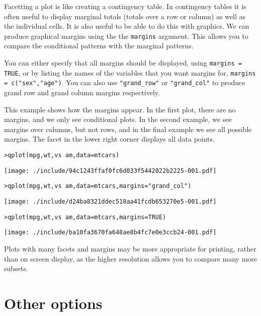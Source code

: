 Facetting a plot is like creating a contingency table.  In contingency tables it is often useful to display marginal totals (totals over a row or column) as well as the individual cells.  It is also useful to be able to do this with graphics.  We can produce graphical margins using the the {\tt margins} argument.  This allows you to compare the conditional patterns with the marginal patterns.

You can either specify that all margins should be displayed, using {\tt margins = TRUE}, or by listing the names of the variables that you want margins for, {\tt margins = c("sex","age")}.  You can also use \verb|"grand_row"| or \verb|"grand_col"| to produce grand row and grand column margins respectively.

This example shows how the margins appear.  In the first plot, there are no margins, and we only see conditional plots.  In the second example, we see margins over columns, but not rows, and in the final example we see all possible margins.  The facet in the lower right corner displays all data points.

\begin{alltt}
> qplot(mpg, wt, vs ~ am, data = mtcars)
\end{alltt}
\texttt{[image: ./include/94c1243ffaf0fc6d033f5442022b2225-001.pdf]}
\begin{alltt}

> qplot(mpg, wt, vs ~ am, data = mtcars, margins = "grand_col")
\end{alltt}
\texttt{[image: ./include/d24ba8321ddec518aa41fcdb653270e5-001.pdf]}
\begin{alltt}

> qplot(mpg, wt, vs ~ am, data = mtcars, margins = TRUE)
\end{alltt}
\texttt{[image: ./include/ba10fa3670fa648ae8b4fc7e0e3ccb24-001.pdf]}
\begin{alltt}

\end{alltt}

Plots with many facets and margins may be more appropriate for printing, rather than on screen display, as the higher resolution allows you to compare many more subsets.

\section{Other options}\label{sec:other_options}

